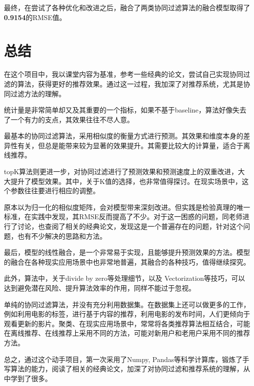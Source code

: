 \documentclass[utf8, a4paper, 11pt, onecolumn]{ctexart}
\begin{document}
\begin{spacing}{1.25}
最终，在尝试了各种优化和改进之后，融合了两类协同过滤算法的融合模型取得了\textbf{0.9154}的RMSE值。

\section{总结}

在这个项目中，我以课堂内容为基准，参考一些经典的论文，尝试自己实现协同过滤的算法，获得更好的推荐效果。通过这一过程，我加深了对推荐系统，尤其是协同过滤方法的理解。

统计量是非常简单却又及其重要的一个指标，如果不基于baseline，算法好像失去了一个有力的支点，其效果往往不尽人意。

最基本的协同过滤算法，采用相似度的衡量方式进行预测。其效果和维度本身的差异性有关，但总是能带来较为显著的效果提升。其需要比较大的计算量，适合于离线推荐。

topK算法则更进一步，对协同过滤进行了预测效果和预测速度上的双重改进，大大提升了模型效果。其中，关于K值的选择，也非常值得探讨。在现实场景中，这个参数往往要进行相应的调整。

原本以为归一化的相似度矩阵，会对模型带来深刻改进。但实践是检验真理的唯一标准，在实践中发现，其RMSE反而提高了不少。对于这一困惑的问题，同老师进行了讨论，也查阅了相关的经典论文，发现这是一个普遍存在的问题，针对这个问题，也有不少解决的思路和方法。

最后，模型的线性融合，是一个非常易于实现，且能够提升预测效果的方法。模型的融合在各种现实应用场景中也非常地普遍，其融合的各种技巧，值得继续探究。

此外，算法中，关于divide by zero等处理细节，以及 Vectorization等技巧，可以达到避免潜在风险、提升算法效率的作用，同样不能过于忽视。

单纯的协同过滤算法，并没有充分利用数据集。在数据集上还可以做更多的工作，例如利用电影的标签，进行基于内容的推荐，利用电影的发布时间，人们更倾向于观看更新的影片。聚类、在现实应用场景中，常常将各类推荐算法相互结合，可能在离线推荐、在线推荐上采用不同的方法，可能对新用户和老用户采用不同的推荐方法。

总之，通过这个动手项目，第一次采用了Numpy, Pandas等科学计算库，锻炼了手写算法的能力，阅读了相关的经典论文，加深了对协同过滤和推荐系统的理解，从中学到了很多。




\end{spacing}
\end{document}
